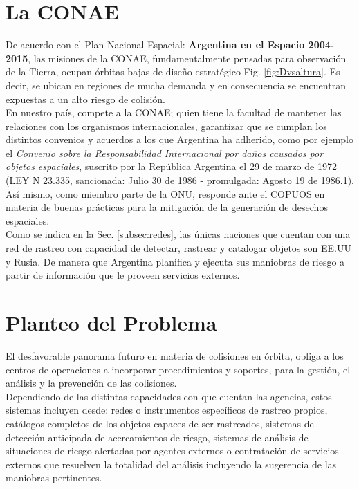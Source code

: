 \section{La \ac{CONAE}}
De acuerdo con el Plan Nacional Espacial: {\bf{ Argentina en el Espacio 2004-2015}}, las misiones de la CONAE, fundamentalmente pensadas para observaci\'on de la Tierra, ocupan \'orbitas bajas de dise\~no estrat\'egico Fig. \ref{fig:Dvsaltura}. Es decir, se ubican en regiones de mucha demanda y en consecuencia se encuentran expuestas a un alto riesgo de colisi\'on.\\
En nuestro pa\'is, compete a la CONAE; quien tiene la facultad de mantener las relaciones con los organismos internacionales, garantizar que se cumplan los distintos convenios y acuerdos a los que Argentina ha adherido, como por ejemplo el {\it{Convenio sobre la Responsabilidad Internacional por da\~nos causados por objetos espaciales}}, suscrito por la Rep\'ublica Argentina el 29 de marzo de 1972 (LEY N 23.335, sancionada: Julio 30 de 1986 - promulgada: Agosto 19 de 1986.1).\\
As\'i mismo, como miembro parte de la ONU, responde ante el COPUOS en materia de buenas pr\'acticas para la mitigaci\'on de la generaci\'on de desechos espaciales.\\

Como se indica en la Sec. \ref{subsec:redes}, las \'unicas naciones que cuentan con una red de rastreo con capacidad de detectar, rastrear y catalogar objetos son EE.UU y Rusia. De manera que Argentina planifica y ejecuta sus maniobras de riesgo a partir de informaci\'on que le proveen servicios externos.\\

\section{Planteo del Problema}

El desfavorable panorama futuro en materia de colisiones en \'orbita, obliga a los centros de operaciones a incorporar procedimientos y soportes, para la gesti\'on, el an\'alisis y la prevenci\'on de las colisiones.\\
Dependiendo de las distintas capacidades con que cuentan las agencias, estos sistemas incluyen desde: redes o instrumentos espec\'ificos de rastreo propios, cat\'alogos completos de los objetos capaces de ser rastreados, sistemas de detecci\'on anticipada de acercamientos de riesgo, sistemas de an\'alisis de situaciones de riesgo alertadas por agentes externos o contrataci\'on de servicios externos que resuelven la totalidad del an\'alisis incluyendo la sugerencia de las maniobras pertinentes.\\

